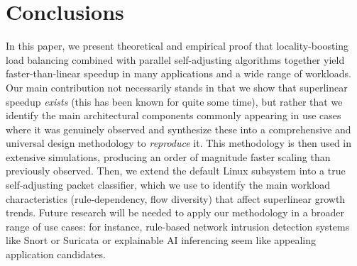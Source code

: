 \section{Conclusions}\label{sec:conclusions}

In this paper, we present theoretical and empirical proof that locality-boosting load balancing combined with parallel self-adjusting algorithms together yield faster-than-linear speedup in many applications and a wide range of workloads. Our main contribution not necessarily stands in that we show that superlinear speedup \emph{exists} (this has been known for quite some time), but rather that we identify the main architectural components commonly appearing in use cases where it was genuinely observed and synthesize these into a comprehensive and universal design methodology to \emph{reproduce} it. This methodology is then used in extensive simulations, producing an order of magnitude faster scaling than previously observed. Then, we extend the default \nftables Linux subsystem into a true self-adjusting packet classifier, which we use to identify the main workload characteristics (rule-dependency, flow diversity) that affect superlinear growth trends.  Future research will be needed to apply our methodology in a broader range of use cases: for instance, rule-based network intrusion detection systems like Snort or Suricata \cite{10.5555/2537857.2537883} or explainable AI inferencing seem like appealing application candidates.


